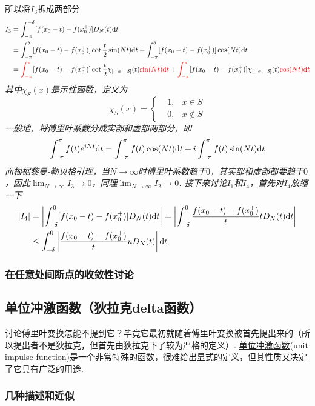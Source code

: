 \documentclass[main.tex]{subfiles}
\begin{document}
所以将\(I_3\)拆成两部分
\begin{align*}
    I_3 &= \int_{-\pi}^{-\delta}[f(x_0-t)-f(x_0^+)]D_N(t){\rm d}t \\
    &= \int_{-\pi}^{\delta}[f(x_0-t)-f(x_0^+)]\cot\frac{t}{2}\sin(Nt){\rm d}t + \int_{-\pi}^{\delta}[f(x_0-t)-f(x_0^+)]\cos(Nt){\rm d}t \\
    &= {\color{red}\int_{-\pi}^{\pi}}[f(x_0-t)-f(x_0^+)]\cot\frac{t}{2}\chi_{[-\pi,-\delta]}(t){\color{red}\sin(Nt){\rm d}t} + {\color{red} \int_{-\pi}^{\pi}}[f(x_0-t)-f(x_0^+)]\chi_{[-\pi,-\delta]}(t){\color{red}\cos(Nt){\rm d}t}
\end{align*}
\textit{其中\(\chi_S(x)\)是示性函数，定义为}
\[\chi_S(x) = \left\{\begin{aligned} & 1, & x \in S \\ & 0, &x \not\in S \end{aligned}\right.\]
\textit{
    一般地，将傅里叶系数分成实部和虚部两部分，即
    \[\int_{-\pi}^{\pi}f(t)e^{iNt}{\rm d}t = \int_{-\pi}^{\pi}f(t)\cos(Nt){\rm d}t + i\int_{-\pi}^{\pi}f(t)\sin(Nt){\rm d}t\]
    而根据黎曼-勒贝格引理，当\(N\to\infty\)时傅里叶系数趋于\(0\)，其实部和虚部都要趋于\(0\)，因此\(\displaystyle{\lim_{N\to\infty}I_3 \to 0}\)，同理\(\displaystyle{\lim_{N\to\infty}I_2 \to 0}\).
    接下来讨论\(I_1\)和\(I_4\)，首先对\(I_4\)放缩一下
}
\begin{align*}
    |I_4| &= \left|\int_{-\delta}^{0}[f(x_0-t)-f(x_0^+)]D_N(t){\rm d}t\right| = \left|\int_{-\delta}^{0}\frac{f(x_0-t)-f(x_0^+)}{t}tD_N(t){\rm d}t\right| \\
        &\leq \int_{-\delta}^{0}\left|\frac{f(x_0-t)-f(x_0^+)}{t}uD_N(t)\right|{\rm d}t
\end{align*}

\subsubsection{在任意处间断点的收敛性讨论}

\subsection{单位冲激函数（狄拉克delta函数）}

讨论傅里叶变换怎能不提到它？毕竟它最初就随着傅里叶变换被首先提出来的（所以提出者不是狄拉克，但首先由狄拉克下了较为严格的定义）. \uline{单位冲激函数}(unit impulse function)是一个非常特殊的函数，很难给出显式的定义，但其性质又决定了它具有广泛的用途.

\subsubsection{几种描述和近似}
\end{document}
